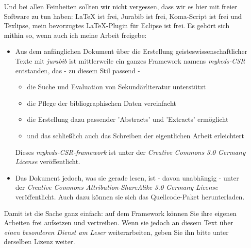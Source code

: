 Und bei allen Feinheiten sollten wir nicht vergessen, dass wir es hier mit
freier Software zu tun haben: LaTeX ist frei, Jurabib ist frei, Koma-Script ist
frei und Texlipse, mein bevorzugtes LaTeX-Plugin für Eclipse ist frei. Es gehört
sich mithin so, wenn auch ich meine Arbeit freigebe: 

\begin{itemize}
  \item Aus dem anfänglichen Dokument über die Erstellung
  geisteswissenschaftlicher Texte mit \textit{jurabib} ist mittlerweile ein
  ganzes Framework namens \textit{mykeds-CSR} entstanden, das - zu diesem Stil
  passend -
  \begin{itemize}
    \item die Suche und Evaluation von Sekundärliteratur unterstützt
    \item die Pflege der bibliographischen Daten vereinfacht
    \item die Erstellung dazu passender 'Abstracts' und 'Extracts' ermöglicht
    \item und das schließlich auch das Schreiben der eigentlichen Arbeit
    erleichtert
  \end{itemize}
  Dieses \textit{mykeds-CSR-framework} ist unter der \textit{Creative Commons
  3.0 Germany License} veröffentlicht.
  \item Das Dokument jedoch, was sie gerade lesen, ist - davon unabhängig -
  unter der \textit{Creative Commons Attribution-ShareAlike 3.0 Germany License}
  veröffentlicht. Auch dazu können sie sich das Quellcode-Paket
  herunterladen.
\end{itemize}

Damit ist die Sache ganz einfach: auf dem Framework können Sie ihre eigenen
Arbeiten frei aufsetzen und vertreiben. Wenn sie jedoch an diesem Text über
\textit{einen besonderen Dienst am Leser} weiterarbeiten, geben Sie ihn bitte
unter derselben Lizenz weiter.

